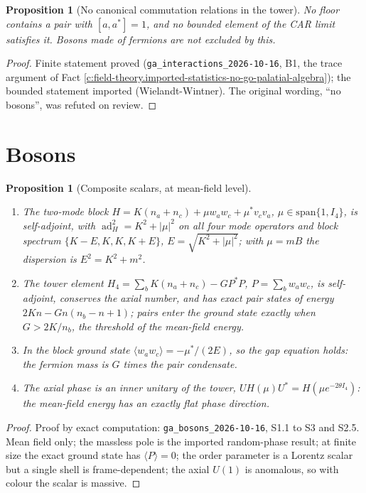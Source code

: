 \documentclass[11pt]{article}
\newtheorem{proposition}[theorem]{Proposition}
\theoremstyle{definition}
\theoremstyle{plain}
\begin{document}
\begin{proposition}[No canonical commutation relations in the tower]\label{c:field-theory.no-canonical-commutation-relations-tower}
No floor contains a pair with $[a, a^*] = 1$, and no bounded element of the CAR limit satisfies it. Bosons made of fermions are not excluded by this.
\end{proposition}
\begin{proof}
Finite statement proved (\texttt{ga\_interactions\_2026-10-16}, B1, the trace argument of Fact \ref{c:field-theory.imported-statistics-no-go-palatial-algebra}); the bounded statement imported (Wielandt-Wintner). The original wording, ``no bosons'', was refuted on review.

\end{proof}

\section{Bosons}

\begin{proposition}[Composite scalars, at mean-field level]\label{c:field-theory.composite-scalars-mean-field-level}
\begin{enumerate}
\item The two-mode block $H = K(n_a + n_c) + \mu w_aw_c + \mu^*v_cv_a$, $\mu \in \mathrm{span}\{1, I_4\}$, is self-adjoint, with $\operatorname{ad}_H^2 = K^2 + |\mu|^2$ on all four mode operators and block spectrum $\{K - E, K, K, K + E\}$, $E = \sqrt{K^2 + |\mu|^2}$; with $\mu = mB$ the dispersion is $E^2 = K^2 + m^2$.
\item The tower element $H_4 = \sum_b K(n_a + n_c) - GP^*P$, $P = \sum_b w_aw_c$, is self-adjoint, conserves the axial number, and has exact pair states of energy $2Kn - Gn(n_b - n + 1)$; pairs enter the ground state exactly when $G > 2K/n_b$, the threshold of the mean-field energy.
\item In the block ground state $\langle w_aw_c\rangle = -\mu^*/(2E)$, so the gap equation holds: the fermion mass is $G$ times the pair condensate.
\item The axial phase is an inner unitary of the tower, $U H(\mu) U^* = H(\mu e^{-2\theta I_4})$: the mean-field energy has an exactly flat phase direction.
\end{enumerate}
\end{proposition}
\begin{proof}
Proof by exact computation: \texttt{ga\_bosons\_2026-10-16}, S1.1 to S3 and S2.5. Mean field only; the massless pole is the imported random-phase result; at finite size the exact ground state has $\langle P\rangle = 0$; the order parameter is a Lorentz scalar but a single shell is frame-dependent; the axial $U(1)$ is anomalous, so with colour the scalar is massive.

\end{proof}
\end{document}
